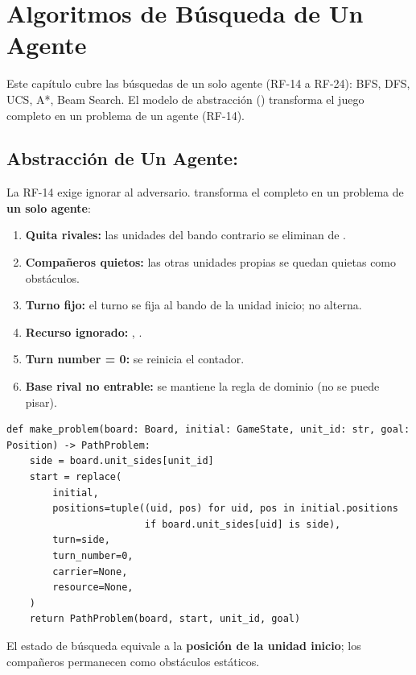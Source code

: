 \chapter{Algoritmos de Búsqueda de Un Agente}
\label{ch:busqueda}

Este capítulo cubre las búsquedas de un solo agente (RF-14 a RF-24): BFS, DFS, UCS, A*, Beam Search.
El modelo de abstracción () transforma el juego completo en un problema de
un agente (RF-14).

\section{Abstracción de Un Agente: }
\label{sec:pathproblem}

La RF-14 exige ignorar al adversario.  transforma el 
completo en un problema de \textbf{un solo agente}:

\begin{enumerate}
\item \textbf{Quita rivales:} las unidades del bando contrario se eliminan de .
\item \textbf{Compañeros quietos:} las otras unidades propias se quedan quietas como obstáculos.
\item \textbf{Turno fijo:} el turno se fija al bando de la unidad inicio; no alterna.
\item \textbf{Recurso ignorado:} , .
\item \textbf{Turn number = 0:} se reinicia el contador.
\item \textbf{Base rival no entrable:} se mantiene la regla de dominio (no se puede pisar).
\end{enumerate}

\begin{verbatim}
def make_problem(board: Board, initial: GameState, unit_id: str, goal: Position) -> PathProblem:
    side = board.unit_sides[unit_id]
    start = replace(
        initial,
        positions=tuple((uid, pos) for uid, pos in initial.positions
                        if board.unit_sides[uid] is side),
        turn=side,
        turn_number=0,
        carrier=None,
        resource=None,
    )
    return PathProblem(board, start, unit_id, goal)
\end{verbatim}

El estado de búsqueda equivale a la \textbf{posición de la unidad inicio}; los compañeros
permanecen como obstáculos estáticos.

